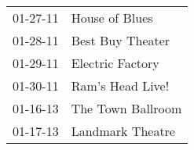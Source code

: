 \begin{supertabular}{p{0.07\textwidth}p{0.23\textwidth}}
 01-27-11 &     House of Blues \\
 01-28-11 &   Best Buy Theater \\
 01-29-11 &   Electric Factory \\
 01-30-11 &   Ram's Head Live! \\
 01-16-13 &  The Town Ballroom \\
 01-17-13 &   Landmark Theatre \\
\end{supertabular}
